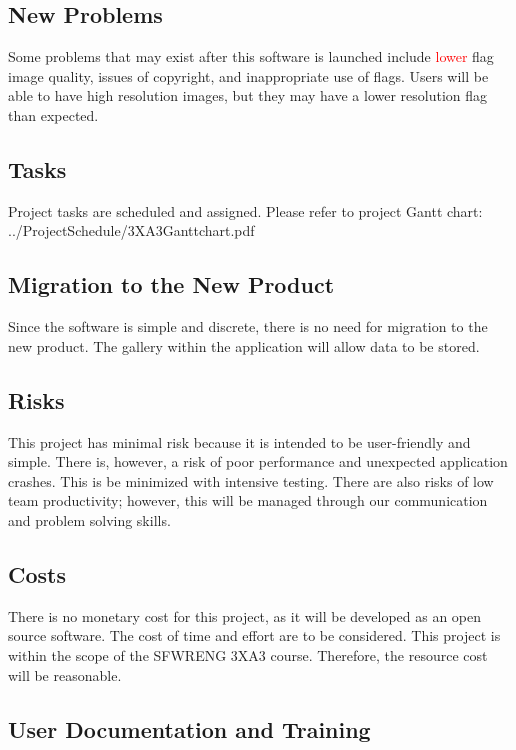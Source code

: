 \documentclass[12pt, titlepage]{article}
\begin{document}
\subsection{New Problems}

Some problems that may exist after this software is launched include \textcolor{red}{lower} flag image quality, issues of copyright, and inappropriate use of flags. Users will be able to have high resolution images, but they may have a lower resolution flag than expected.

\subsection{Tasks}

Project tasks are scheduled and assigned. Please refer to project Gantt chart: ../ProjectSchedule/3XA3Ganttchart.pdf

\subsection{Migration to the New Product}

Since the software is simple and discrete, there is no need for migration to the new product. The gallery within the application will allow data to be stored.

\subsection{Risks}

This project has minimal risk because it is intended to be user-friendly and simple. There is, however, a risk of poor performance and unexpected application crashes. This is be minimized with intensive testing. There are also risks of low team productivity; however, this will be managed through our communication and problem solving skills.

\subsection{Costs}

There is no monetary cost for this project, as it will be developed as an open source software. The cost of time and effort are to be considered. This project is within the scope of the SFWRENG 3XA3 course. Therefore, the resource cost will be reasonable.

\subsection{User Documentation and Training}
\end{document}
